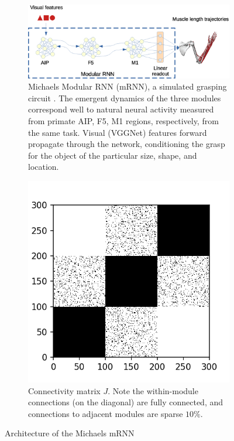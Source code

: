 \documentclass[12pt]{iopart}
\begin{document}
\begin{figure}
	\centering
	\begin{subfigure}[c]{0.69\textwidth}
		\centering
		\includegraphics[width=\textwidth]{michaels.eps}
		\caption{Michaels Modular RNN (mRNN), a simulated grasping circuit \cite{michaels.mrnn}.
		The emergent dynamics of the three modules correspond well to natural neural activity
		measured from primate AIP, F5, M1 regions, respectively, from the same task. Visual
		(VGGNet) features forward propagate through the network, conditioning the grasp for the
		object of the particular size, shape, and location.}
	\end{subfigure}
	\hfill
	\begin{subfigure}[c]{0.30\textwidth}
		\centering
		\includegraphics[width=\textwidth]{mRNN_J.png}
		\caption{Connectivity matrix $J$. Note the within-module connections
		(on the diagonal) are fully connected, and connections to adjacent
		modules are sparse $10\%$.}
	\end{subfigure}
	\hfill
\caption{Architecture of the Michaels mRNN}
\label{fig:michaels}
\end{figure}
\end{document}
